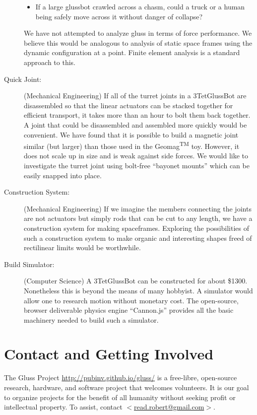 \documentclass[11pt]{article}
\begin{document}
\begin{description}
\begin{itemize}
\item If a large glussbot crawled across a chasm, could a truck or a human being safely move
  across it without danger of collapse?
\end{itemize}
We have not attempted to analyze gluss in terms of force performance. We believe this would
be analogous to analysis of static space frames using the dynamic configuration at a point.
Finite element analysis is a standard approach to this.
\item [Quick Joint:] (Mechanical Engineering) If all of the turret joints in a 3TetGlussBot are disassembled so that
  the linear actuators can be stacked together for efficient transport, it takes more than an hour
  to bolt them back together.
    A joint that could be
  disassembled and assembled more quickly would be convenient.
We have found that it is possible to build a magnetic
  joint similar (but larger) than those used in the Geomag\textsuperscript{TM} toy. However, it does not scale up in size
  and is weak against side forces. We would like to investigate the turret joint using bolt-free ``bayonet mounts'' which
  can be easily snapped into place.
\item [Construction System:] (Mechanical Engineering) If we imagine the members connecting the joints are not actuators but
  simply rods that can be cut to any length, we have a construction system for making spaceframes.
  Exploring the possibilities of such a construction system to make organic and interesting shapes
  freed of rectilinear limits would be worthwhile.
\item [Build Simulator:] (Computer Science) A 3TetGlussBot can be constructed for about \$1300. Nonetheless this
  is beyond the means of many hobbyist. A simulator would allow one to research 
  motion without monetary cost. The open-source, browser deliverable physics engine ``Cannon.js''
  provides all the basic machinery needed to build such a simulator.
\end{description}


\section{Contact and Getting Involved}

The Gluss Project \href{http://pubinv.github.io/gluss/}{http://pubinv.github.io/gluss/}
is a free-libre, open-source research, hardware, and software project that welcomes volunteers.
It is our goal to organize projects for the benefit of all humanity without seeking profit or intellectual property.
To assist, contact \href{mailto:read.robert@gmail.com}{$<$read.robert@gmail.com$>$}.
\end{document}
